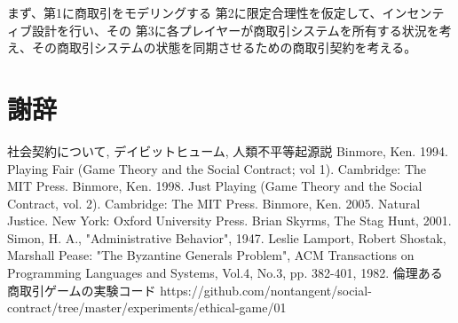 \documentclass[a4j]{ujreport}
\begin{document}
まず、第1に商取引をモデリングする
第2に限定合理性を仮定して、インセンティブ設計を行い、その
第3に各プレイヤーが商取引システムを所有する状況を考え、その商取引システムの状態を同期させるための商取引契約を考える。






\chapter*{謝辞}

\begin{thebibliography}{数字}
   社会契約について, デイビットヒューム,
   人類不平等起源説
   Binmore, Ken. 1994. Playing Fair (Game Theory and the Social Contract; vol 1). Cambridge: The MIT Press.
   Binmore, Ken. 1998. Just Playing (Game Theory and the Social Contract, vol. 2). Cambridge: The MIT Press.
   Binmore, Ken. 2005. Natural Justice. New York: Oxford University Press.
   Brian Skyrms, The Stag Hunt, 2001.
   Simon, H. A., "Administrative Behavior", 1947.
   Leslie Lamport, Robert Shostak, Marshall Pease: "The Byzantine Generals Problem", ACM Transactions on Programming Languages and Systems, Vol.4, No.3, pp. 382-401, 1982.
   倫理ある商取引ゲームの実験コード https://github.com/nontangent/social-contract/tree/master/experiments/ethical-game/01
\end{thebibliography}
\end{document}
